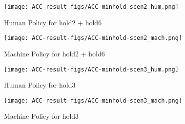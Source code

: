 \begin{figure}[h]
    \texttt{[image: ACC-result-figs/ACC-minhold-scen2\_hum.png]}
    \caption{Human Policy for hold2 + hold6}
    \label{fig:hold-s2-hum}
\end{figure}

\begin{figure}[h]
    \texttt{[image: ACC-result-figs/ACC-minhold-scen2\_mach.png]}
    \caption{Machine Policy for hold2 + hold6}
    \label{fig:hold-s2-mach}
\end{figure}

\begin{figure}[h]
    \texttt{[image: ACC-result-figs/ACC-minhold-scen3\_hum.png]}
    \caption{Human Policy for hold3}
    \label{fig:hold-s3-hum}
\end{figure}

\begin{figure}[h]
    \texttt{[image: ACC-result-figs/ACC-minhold-scen3\_mach.png]}
    \caption{Machine Policy for hold3}
    \label{fig:hold-s3-mach}
\end{figure}

